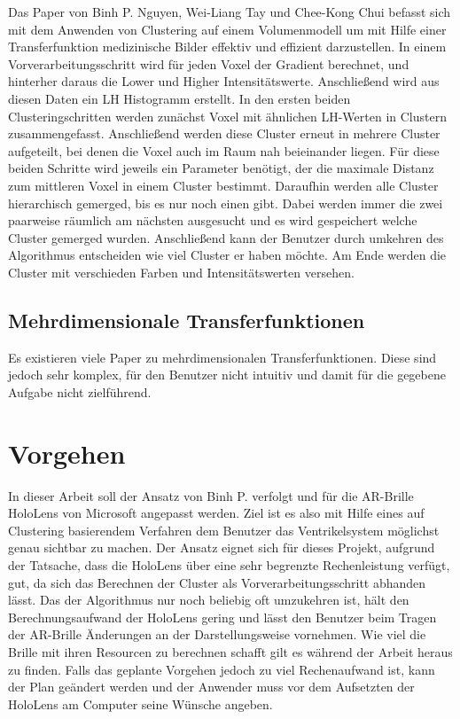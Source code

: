 \documentclass{article}
\begin{document}
Das Paper von Binh P. Nguyen, Wei-Liang Tay und Chee-Kong Chui \cite{nguyen2012clustering} befasst sich mit dem Anwenden von Clustering auf einem Volumenmodell um mit Hilfe einer Transferfunktion medizinische Bilder effektiv und effizient darzustellen.
\newline
In einem Vorverarbeitungsschritt wird für jeden Voxel der Gradient berechnet, und hinterher daraus die Lower und Higher Intensitätswerte. Anschließend wird aus diesen Daten ein LH Histogramm erstellt.
\newline
In den ersten beiden Clusteringschritten werden zunächst Voxel mit ähnlichen  LH-Werten in Clustern zusammengefasst. Anschließend werden diese Cluster erneut in mehrere Cluster aufgeteilt, bei denen die Voxel auch im Raum nah beieinander liegen. Für diese beiden Schritte wird jeweils ein Parameter benötigt, der die maximale Distanz zum mittleren Voxel in einem Cluster bestimmt. Daraufhin werden alle Cluster hierarchisch gemerged, bis es nur noch einen gibt. Dabei werden immer die zwei paarweise räumlich am nächsten ausgesucht und es wird gespeichert welche Cluster gemerged wurden. Anschließend kann der Benutzer durch umkehren des Algorithmus entscheiden wie viel Cluster er haben möchte. Am Ende werden die Cluster mit verschieden Farben und Intensitätswerten versehen.



\subsection{Mehrdimensionale Transferfunktionen}

Es existieren viele Paper zu mehrdimensionalen Transferfunktionen. Diese sind jedoch sehr komplex, für den Benutzer nicht intuitiv und damit für die gegebene Aufgabe nicht zielführend.


\section{Vorgehen}

In dieser Arbeit soll der Ansatz von Binh P. \cite{nguyen2012clustering} verfolgt und für die AR-Brille HoloLens von Microsoft angepasst werden. Ziel ist es also mit Hilfe eines auf Clustering basierendem Verfahren dem Benutzer das Ventrikelsystem möglichst genau sichtbar zu machen.
\newline
Der Ansatz eignet sich für dieses Projekt, aufgrund der Tatsache, dass die HoloLens über eine sehr begrenzte Rechenleistung verfügt, gut, da sich das Berechnen der Cluster als Vorverarbeitungsschritt abhanden lässt. Das der Algorithmus nur noch beliebig oft umzukehren ist, hält den Berechnungsaufwand der HoloLens gering und lässt den Benutzer beim Tragen der AR-Brille Änderungen an der Darstellungsweise vornehmen. Wie viel die Brille mit ihren Resourcen zu berechnen schafft gilt es während der Arbeit heraus zu finden.  Falls das geplante Vorgehen jedoch zu viel Rechenaufwand ist, kann der Plan geändert werden und der Anwender muss vor dem Aufsetzten der HoloLens am Computer seine Wünsche angeben.
\end{document}
